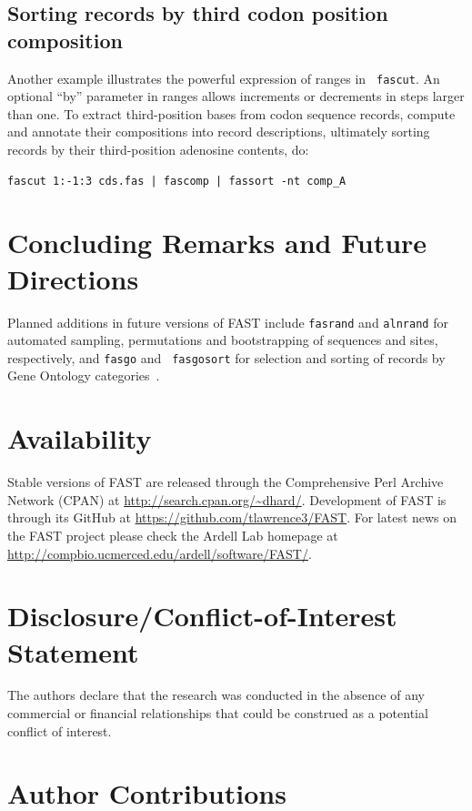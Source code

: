 \documentclass{frontiersSCNS} %
\begin{document}
\subsection{Sorting records by third codon position composition}

Another example illustrates the powerful expression of ranges in {\tt
  fascut}. An optional ``by'' parameter in ranges allows increments or
decrements in steps larger than one. To extract third-position bases
from codon sequence records, compute and annotate their compositions
into record descriptions, ultimately sorting records by
their third-position adenosine contents, do:

\begin{verbatim}
fascut 1:-1:3 cds.fas | fascomp | fassort -nt comp_A
\end{verbatim}

\section{Concluding Remarks and Future Directions}

Planned additions in future versions of FAST include {\tt fasrand} and
{\tt alnrand} for automated sampling, permutations and bootstrapping
of sequences and sites, respectively, and {\tt fasgo} and {\tt
  fasgosort} for selection and sorting of records by Gene Ontology
categories~\citep{GO_Consortium28012015}.

\section*{Availability}

Stable versions of FAST are released through the Comprehensive Perl
Archive Network (CPAN) at
\url{http://search.cpan.org/~dhard/}. Development of FAST is through
its GitHub at \url{https://github.com/tlawrence3/FAST}. For latest
news on the FAST project please check the Ardell Lab homepage at
\url{http://compbio.ucmerced.edu/ardell/software/FAST/}.

\section*{Disclosure/Conflict-of-Interest Statement}

The authors declare that the research was conducted in the absence of
any commercial or financial relationships that could be construed as a
potential conflict of interest.

\section*{Author Contributions}
\end{document}
